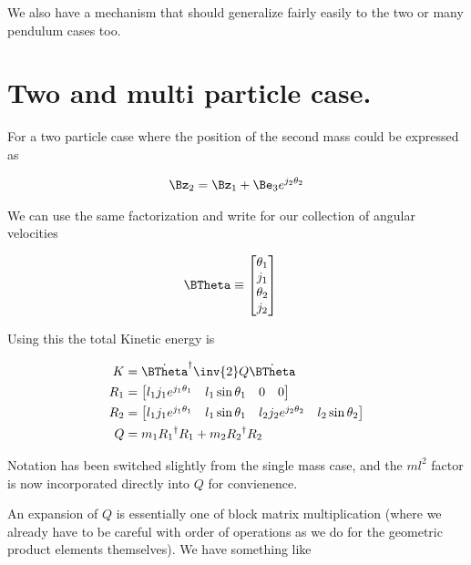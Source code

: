 We also have a mechanism that should generalize fairly easily to the two or many pendulum cases too.

\section{Two and multi particle case.}

For a two particle case where the position of the second mass could be expressed as

\begin{align}\label{eqn:sPolarMultiPendulum:zoo11a}
\Bz_2 = \Bz_1 + \Be_3 e^{j_2 \theta_2}
\end{align}

We can use the same factorization and write for our collection of angular velocities

\begin{align}\label{eqn:sPolarMultiPendulum:zoo11}
\BTheta &\equiv
\begin{bmatrix}
\theta_1 \\ j_1 \\
\theta_2 \\ j_2 \\
\end{bmatrix} 
\end{align}

Using this the total Kinetic energy is

\begin{align}\label{eqn:sPolarMultiPendulum:zoo12}
K &= {\dot{\BTheta}}^\dagger \inv{2} Q \dot{\BTheta} \\
R_1 &=
\begin{bmatrix}
l_1 j_1 e^{j_1\theta_1} & 
l_1 \sin\theta_1 &
0 &
0
\end{bmatrix} \\
R_2 &=
\begin{bmatrix}
 l_1 j_1 e^{j_1\theta_1} & 
 l_1 \sin\theta_1 &
 l_2 j_2 e^{j_2\theta_2} & 
 l_2 \sin\theta_2 
\end{bmatrix} \\
Q &=
m_1 {R_1}^\dagger R_1
+m_2 {R_2}^\dagger R_2
\end{align}

Notation has been switched slightly from the single mass case, and the $m l^2$ factor is now incorporated directly into $Q$ for convienence.

An expansion of $Q$ is essentially one of block matrix multiplication (where we already have to be careful with order of operations as we do for the geometric product elements themselves).  We have something like


